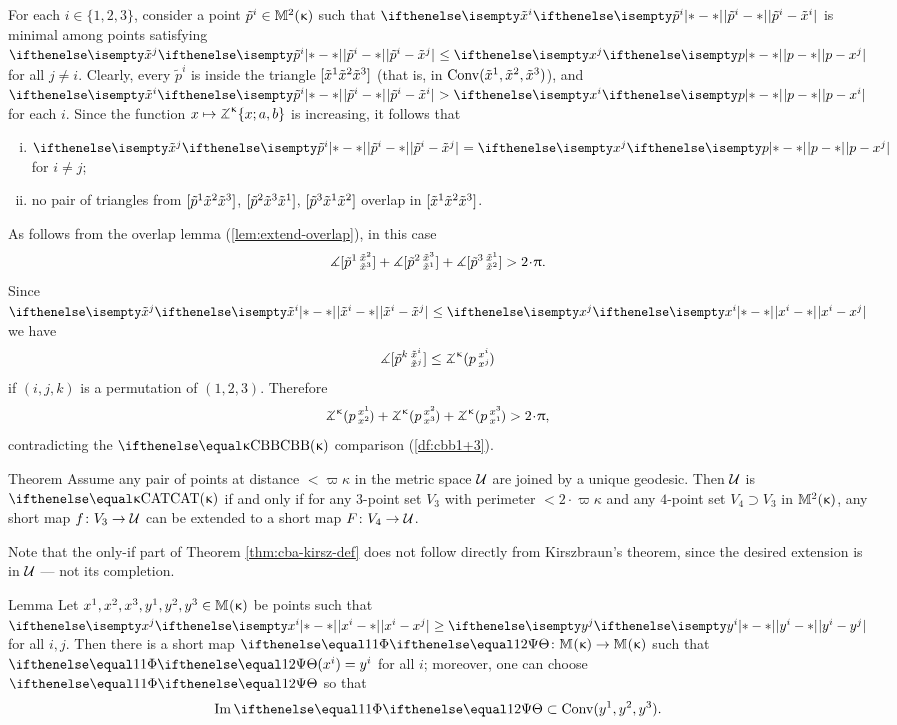 For each $i\in \{1,2,3\}$, consider a point $\tilde p^i\in\Lob2\kappa$ such that $\dist{\tilde p^i}{\tilde x^i}{}$ is minimal among points satisfying $\dist{\tilde p^i}{\tilde x^j}{}\le\dist{p}{ x^j}{}$ for all $j\ne i$. 
Clearly, every $\tilde p^i$ is inside the triangle $[{\tilde x^1}{\tilde x^2}{\tilde x^3}]$ (that is, in $\mathop{\rm Conv}\nolimits(\tilde x^1,\tilde x^2,\tilde x^3)$), and $\dist{\tilde p^i}{\tilde x^i}{}>\dist{p}{ x^i}{}$ for each $i$.
Since the function $x\mapsto\tangle\mc\kappa\{x;a,b\}$
is increasing, it follows that
\begin{enumerate}[(i)]
\item $\dist{\tilde p^i}{\tilde x^j}{}=\dist{p}{ x^j}{}$ for $i\ne j$;
\item no pair of triangles from $[{\tilde p^1}{\tilde x^2}{\tilde x^3}]$, $[{\tilde p^2}{\tilde x^3}{\tilde x^1}]$, $[{\tilde p^3}{\tilde x^1}{\tilde x^2}]$ overlap in $[{\tilde x^1}{\tilde x^2}{\tilde x^3}]$.
\end{enumerate}

As follows from the overlap lemma (\ref{lem:extend-overlap}), 
in this case 
\[\mangle\hinge {\tilde p^1}{\tilde x^2}{\tilde x^3} 
+\mangle\hinge {\tilde p^2}{\tilde x^3}{\tilde x^1}
+\mangle\hinge {\tilde p^3}{\tilde x^1}{\tilde x^2}
>2\cdot\pi.
\]
Since $\dist{\tilde x^i}{\tilde x^j}{}\le\dist{x^i}{x^j}{}$ we have
\[\mangle\hinge {\tilde p^\kay}{\tilde x^i}{\tilde x^j}
\le
\angk\kappa p{x^i}{x^j}\]
if $(i,j,k)$ is a permutation of $(1,2,3)$.
Therefore 
\[\angk\kappa p{x^1}{x^2}+\angk\kappa p{x^2}{x^3}+\angk\kappa p{x^3}{x^1}>2\cdot\pi,\]
contradicting the $\Alex\kappa$ comparison (\ref{df:cbb1+3}).
\qeds

\begin{thm}{Theorem}\label{thm:cba-kirsz-def} 
Assume any pair of points at distance $<\varpi\kappa$ in the metric space $\mathcal{U}$ are joined by a unique geodesic. 
Then $\mathcal{U}$ is $\CAT\kappa$ if and only if 
for any $3$-point set $V_3$  with perimeter $<2\cdot\varpi\kappa$
and any $4$-point set $V_4\supset V_3$ in $\mathbb{M}_{{}}^{2}({\upkappa})$,
any short map $f\:V_3\to\spc{U}$ can be extended to a short map $F\:V_4\to\spc{U}$.
\end{thm}

Note that the only-if part of Theorem \ref{thm:cba-kirsz-def} does not follow directly from Kirszbraun's theorem, since the desired extension is in $\mathcal{U}$ --- not its completion.

\begin{thm}{Lemma}\label{lem:smaller-trig}
Let $x^1,x^2,x^3,y^1,y^2,y^3\in\Lob{}{\kappa}$
be points such that $\dist{x^i}{x^j}{}\ge\dist{y^i}{y^j}{}$ for all $i,j$.
Then there is a short map $\map\:\Lob{}{\kappa}\to\Lob{}{\kappa}$ such that $\map(x^i)=y^i$ for all $i$;
moreover, one can choose $\map$ so that 
\[\Im \map\subset\Conv(y^1,y^2,y^3).\]

\end{thm}

